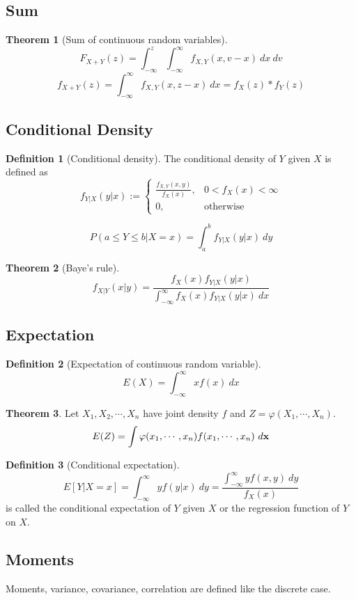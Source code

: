 \documentclass[10pt, a4paper]{extarticle}
\theoremstyle{definition}
\newtheorem{thm}{Theorem}
\newtheorem{defn}{Definition}
\begin{document}
	\subsection{Sum}
	\begin{thm}[Sum of continuous random variables]
	\[F_{X+Y}(z)=\int_{-\infty}^z\int_{-\infty}^\infty f_{X,Y}(x,v-x)\ dx\ dv\]
	\[f_{X+Y}(z)=\int_{-\infty}^\infty f_{X,Y}(x,z-x)\ dx=f_X(z)*f_Y(z)\]
	\end{thm}

	\subsection{Conditional Density}
	\begin{defn}[Conditional density]
		The conditional density of $Y$ given $X$ is defined as
		\[f_{Y|X}(y|x):=
			\begin{cases}
				\frac{f_{X,Y}(x,y)}{f_X(x)},&0<f_X(x)<\infty\\
				0,&\text{otherwise}
			\end{cases}
		\]

		\[P(a\leq Y\leq b|X=x)=\int_a^b f_{Y|X}(y|x)\ dy\]
		
	\end{defn}
	\begin{thm}[Baye's rule]
		\[f_{X|Y}(x|y)=\frac{f_X(x)f_{Y|X}(y|x)}{\int_{-\infty}^{\infty}f_X(x)f_{Y|X}(y|x)\ dx}\]
	\end{thm}

	\subsection{Expectation}
	\begin{defn}[Expectation of continuous random variable]
		\[E(X)=\int_{-\infty}^\infty xf(x)\ dx\]
	\end{defn}
	\begin{thm}
		Let $X_1,X_2,\cdots,X_n$ have joint density $f$ and $Z=\varphi(X_1,\cdots,X_n)$.
		\[E(Z)=\int \varphi(x_1,\cdots,x_n)f(x_1,\cdots,x_n)\ d\vb{x}\]
	\end{thm}
	\begin{defn}[Conditional expectation]
		\[E[Y|X=x]=\int_{-\infty}^\infty yf(y|x)\ dy=\frac{\int_{-\infty}^\infty yf(x,y)\ dy}{f_X(x)}\]
		is called the conditional expectation of $Y$ given $X$ or the regression function of $Y$ on $X$.
	\end{defn}

	\subsection{Moments}
	Moments, variance, covariance, correlation are defined like the discrete case.
\end{document}
